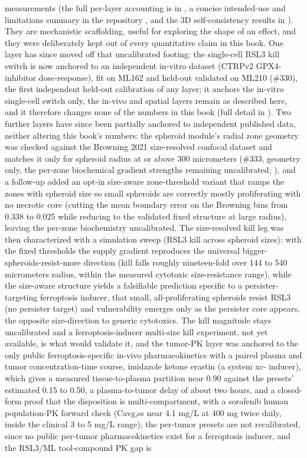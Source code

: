\documentclass[11pt,twoside,openright]{report}
\begin{document}
measurements (the full per-layer accounting is in , a concise intended-use and limitations summary in the repository , and the 3D self-consistency results in ). They are mechanistic scaffolding, useful for exploring the shape of an effect, and they were deliberately kept out of every quantitative claim in this book. One layer has since moved off that uncalibrated footing: the single-cell RSL3 kill switch is now anchored to an independent in-vitro dataset (CTRPv2 GPX4-inhibitor dose-response), fit on ML162 and held-out validated on ML210 (\#330), the first independent held-out calibration of any layer; it anchors the in-vitro single-cell switch only, the in-vivo and spatial layers remain as described here, and it therefore changes none of the numbers in this book (full detail in ). Two further layers have since been partially anchored to independent published data, neither altering this book's numbers: the spheroid module's radial zone geometry was checked against the Browning 2021 size-resolved confocal dataset and matches it only for spheroid radius at or above 300 micrometers (\#333, geometry only, the per-zone biochemical gradient strengths remaining uncalibrated; ), and a follow-up added an opt-in size-aware zone-threshold variant that ramps the zones with spheroid size so small spheroids are correctly mostly proliferating with no necrotic core (cutting the mean boundary error on the Browning bins from 0.338 to 0.025 while reducing to the validated fixed structure at large radius), leaving the per-zone biochemistry uncalibrated. The size-resolved kill leg was then characterized with a simulation sweep (RSL3 kill across spheroid sizes): with the fixed thresholds the supply gradient reproduces the universal bigger-spheroids-resist-more direction (kill falls roughly nineteen-fold over 144 to 540 micrometers radius, within the measured cytotoxic size-resistance range), while the size-aware structure yields a falsifiable prediction specific to a persister-targeting ferroptosis inducer, that small, all-proliferating spheroids resist RSL3 (no persister target) and vulnerability emerges only as the persister core appears, the opposite size-direction to generic cytotoxics. The kill magnitude stays uncalibrated and a ferroptosis-inducer multi-size kill experiment, not yet available, is what would validate it, and the tumor-PK layer was anchored to the only public ferroptosis-specific in-vivo pharmacokinetics with a paired plasma and tumor concentration-time course, imidazole ketone erastin (a system xc- inducer), which gives a measured tissue-to-plasma partition near 0.90 against the presets' estimated 0.15 to 0.50, a plasma-to-tumor delay of about two hours, and a closed-form proof that the disposition is multi-compartment, with a sorafenib human population-PK forward check (Cavg,ss near 4.1 mg/L at 400 mg twice daily, inside the clinical 3 to 5 mg/L range); the per-tumor presets are not recalibrated, since no public per-tumor pharmacokinetics exist for a ferroptosis inducer, and the RSL3/ML tool-compound PK gap is 
\end{document}
